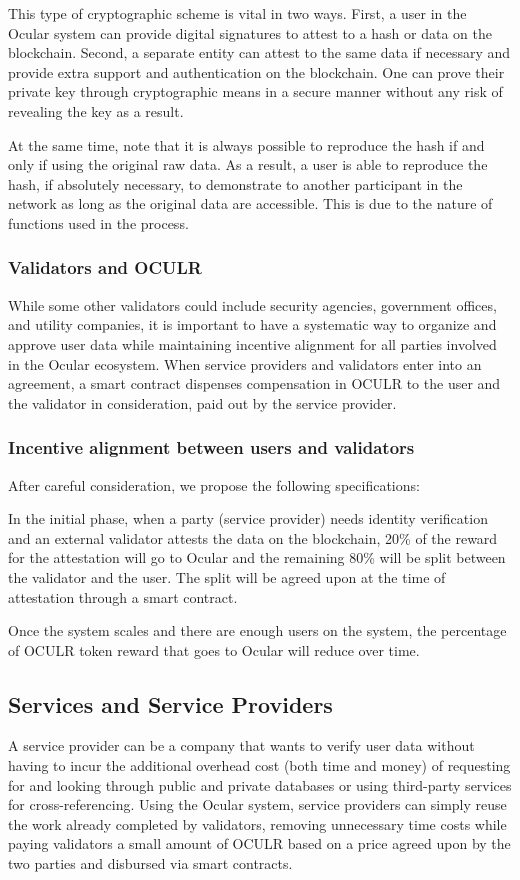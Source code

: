 \documentclass[a4paper]{article}
\let\tempone\itemize
\let\temptwo\enditemize
\renewenvironment{itemize}{\tempone\addtolength{\itemsep}{-5pt}}{\temptwo}
\begin{document}
This type of cryptographic scheme is vital in two ways. First, a user in the Ocular system can provide digital signatures to attest to a hash or data on the blockchain. Second, a separate entity can attest to the same data if necessary and provide extra support and authentication on the blockchain. One can prove their private key through cryptographic means in a secure manner without any risk of revealing the key as a result.

At the same time, note that it is always possible to reproduce the hash if and only if using the original raw data. As a result, a user is able to reproduce the hash, if absolutely necessary, to demonstrate to another participant in the network as long as the original data are accessible. This is due to the nature of functions used in the process.

\subsubsection*{Validators and OCULR}
While some other validators could include security agencies, government offices, and utility companies, it is important to have a systematic way to organize and approve user data while maintaining incentive alignment for all parties involved in the Ocular ecosystem. When service providers and validators enter into an agreement, a smart contract dispenses compensation in OCULR to the user and the validator in consideration, paid out by the service provider. 
\subsubsection* {Incentive alignment between users and validators}
After careful consideration, we propose the following specifications:
\begin{itemize}
\item In the initial phase, when a party (service provider) needs identity verification and an external validator attests the data on the blockchain, 20\% of the reward for the attestation will go to Ocular and the remaining 80\% will be split between the validator and the user. The split will be agreed upon at the time of attestation through a smart contract. 
\item Once the system scales and there are enough users on the system, the percentage of OCULR token reward that goes to Ocular will reduce over time. 
\end{itemize}

\subsection{Services and Service Providers}
A service provider can be a company that wants to verify user data without having to incur the additional overhead cost (both time and money) of requesting for and looking through public and private databases or using third-party services for cross-referencing. Using the Ocular system, service providers can simply reuse the work already completed by validators, removing unnecessary time costs while paying validators a small amount of OCULR based on a price agreed upon by the two parties and disbursed via smart contracts.
\end{document}
